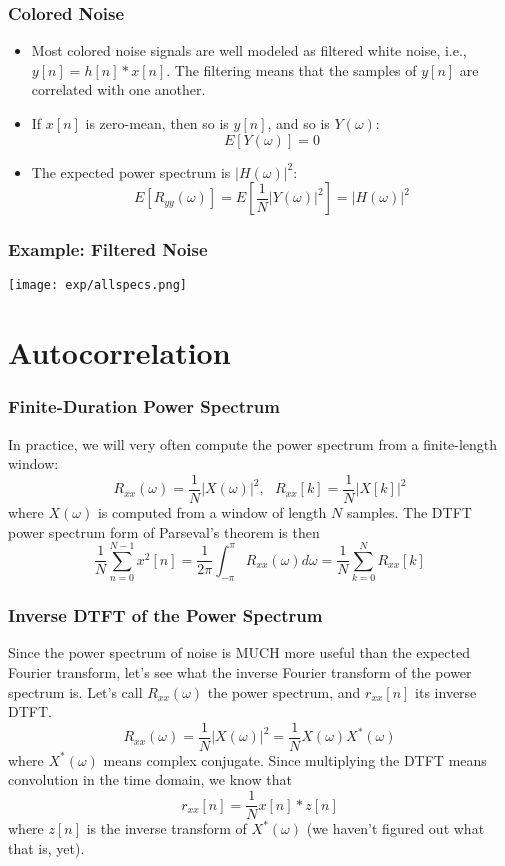 \documentclass{beamer}
\begin{document}
\begin{frame}
  \frametitle{Colored Noise}

  \begin{itemize}
  \item Most colored noise signals are well modeled as filtered white
    noise, i.e., $y[n]=h[n]\ast x[n]$.  The filtering means that the
    samples of $y[n]$ are correlated with one another.
  \item If $x[n]$ is zero-mean, then so is $y[n]$, and so is $Y(\omega)$:
    \begin{displaymath}
      E\left[Y(\omega)\right] = 0
    \end{displaymath}
  \item The expected power spectrum is $|H(\omega)|^2$:
    \begin{displaymath}
      E\left[R_{yy}(\omega)\right] =  E\left[\frac{1}{N}|Y(\omega)|^2\right] = |H(\omega)|^2
    \end{displaymath}
  \end{itemize}
\end{frame}

\begin{frame}
  \frametitle{Example: Filtered Noise}
  
  \centerline{\texttt{[image: exp/allspecs.png]}}
\end{frame}

\section[Autocorrelation]{Autocorrelation}
\setcounter{subsection}{1}

\begin{frame}
  \frametitle{Finite-Duration Power Spectrum}
  In practice, we will very often compute the power spectrum
  from a finite-length window:
  \[
  R_{xx}(\omega) = \frac{1}{N}|X(\omega)|^2,~~~R_{xx}[k]=\frac{1}{N}|X[k]|^2
  \]
  where $X(\omega)$ is computed from a window of length $N$ samples.
  The DTFT power spectrum form of Parseval's theorem is then
  \[
  \frac{1}{N}\sum_{n=0}^{N-1}x^2[n] =
  \frac{1}{2\pi}\int_{-\pi}^\pi R_{xx}(\omega)d\omega = \frac{1}{N}\sum_{k=0}^N R_{xx}[k]
  \]
\end{frame}

\begin{frame}
  \frametitle{Inverse DTFT of the Power Spectrum}

  Since the power spectrum of noise is MUCH more useful than the
  expected Fourier transform, let's see what the inverse Fourier transform of the power spectrum
  is.  Let's call $R_{xx}(\omega)$ the power spectrum, and $r_{xx}[n]$ its inverse
  DTFT.
  \[
  R_{xx}(\omega) = \frac{1}{N}|X(\omega)|^2 = \frac{1}{N}X(\omega)X^*(\omega)
  \]
  where $X^*(\omega)$ means complex conjugate.  Since multiplying the DTFT
  means convolution in the time domain, we know that
  \[
  r_{xx}[n] = \frac{1}{N} x[n]\ast z[n]
  \]
  where $z[n]$ is the inverse transform of $X^*(\omega)$ (we haven't
  figured out what that is, yet).
\end{frame}
\end{document}
